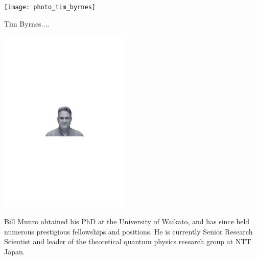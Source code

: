 
%
%

\begin{center}
\texttt{[image: photo\_tim\_byrnes]}
\end{center}

Tim Byrnes....


%
%

\begin{center}
\includegraphics[width=0.47\textwidth]{photo_bill_munro}
\end{center}

Bill Munro obtained his PhD at the University of Waikato, and has since held numerous prestigious fellowships and positions. He is currently Senior Research Scientist and leader of the theoretical quantum physics research group at NTT Japan.

